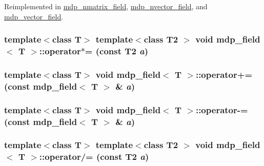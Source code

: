 Reimplemented in \hyperlink{classmdp__nmatrix__field_a389126da9ddf86d42b27d4d9d20245f8}{mdp\_\-nmatrix\_\-field}, \hyperlink{classmdp__nvector__field_afddf6115e2d88a72727d66949436d8ca}{mdp\_\-nvector\_\-field}, and \hyperlink{classmdp__vector__field_aa50ba6cb67e5978d0e362b70ea703164}{mdp\_\-vector\_\-field}.\hypertarget{classmdp__field_a47e967ad0fd9e0ac3e4f106e2b9c9897}{
\subsubsection[{operator$\ast$=}]{\setlength{\rightskip}{0pt plus 5cm}template$<$class T$>$ template$<$class T2 $>$ void {\bf mdp\_\-field}$<$ T $>$::operator$\ast$= (const T2 {\em a})}}
\label{classmdp__field_a47e967ad0fd9e0ac3e4f106e2b9c9897}
\hypertarget{classmdp__field_a274d9e292a6adc1703a5ad585c99036e}{
\subsubsection[{operator+=}]{\setlength{\rightskip}{0pt plus 5cm}template$<$class T$>$ void {\bf mdp\_\-field}$<$ T $>$::operator+= (const {\bf mdp\_\-field}$<$ T $>$ \& {\em a})}}
\label{classmdp__field_a274d9e292a6adc1703a5ad585c99036e}
\hypertarget{classmdp__field_a84b91b09eff5b553ea69bbcb0da9fbd4}{
\subsubsection[{operator-\/=}]{\setlength{\rightskip}{0pt plus 5cm}template$<$class T$>$ void {\bf mdp\_\-field}$<$ T $>$::operator-\/= (const {\bf mdp\_\-field}$<$ T $>$ \& {\em a})}}
\label{classmdp__field_a84b91b09eff5b553ea69bbcb0da9fbd4}
\hypertarget{classmdp__field_a3d66759cffa9ddbb3d158551247e738f}{
\subsubsection[{operator/=}]{\setlength{\rightskip}{0pt plus 5cm}template$<$class T$>$ template$<$class T2 $>$ void {\bf mdp\_\-field}$<$ T $>$::operator/= (const T2 {\em a})}}
